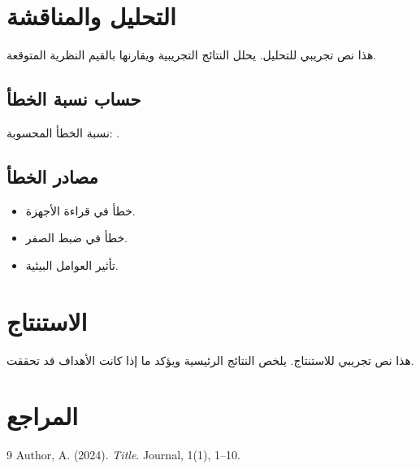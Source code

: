\documentclass[11pt,a4paper]{article}
\begin{document}

\section{التحليل والمناقشة}
\label{sec:analysis}

هذا نص تجريبي للتحليل. يحلل النتائج التجريبية ويقارنها بالقيم النظرية المتوقعة.

\subsection{حساب نسبة الخطأ}
نسبة الخطأ المحسوبة: .

\subsection{مصادر الخطأ}
\begin{itemize}
    \item خطأ في قراءة الأجهزة.
    \item خطأ في ضبط الصفر.
    \item تأثير العوامل البيئية.
\end{itemize}

\section{الاستنتاج}
\label{sec:conclusion}

هذا نص تجريبي للاستنتاج. يلخص النتائج الرئيسية ويؤكد ما إذا كانت الأهداف قد تحققت.

\section*{المراجع}

\begin{thebibliography}{9}
 Author, A. (2024). \emph{Title}. Journal, 1(1), 1--10.
\end{thebibliography}
\end{document}
